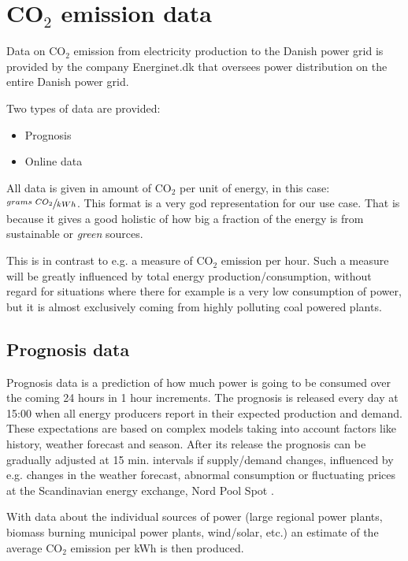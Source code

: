 \documentclass[Main]{subfiles}
\begin{document}
\section{CO$_2$ emission data} %
\label{sub:c02_emission_data}

	Data on CO$_2$ emission from electricity production to the Danish power grid is provided by the company Energinet.dk that oversees power distribution on the entire Danish power grid.

	Two types of data are provided:
	\begin{itemize}
		\item Prognosis \cite{EnerginetFTPPrognosis:Online}
		\item Online data \cite{EnerginetFTPOnline:Online}
	\end{itemize}

	All data is given in amount of CO$_2$ per unit of energy, in this case: 
	$\sfrac{grams\ CO_2}{kWh}$.
	This format is a very god representation for our use case.
	That is because it gives a good holistic of how big a fraction of the energy is from sustainable or \emph{green} sources.
	
	This is in contrast to e.g. a measure of CO$_2$ emission per hour.
	Such a measure will be greatly influenced by total energy production/consumption, without regard for situations where there for example is a very low consumption of power, but it is almost exclusively coming from highly polluting coal powered plants.

	\subsection{Prognosis data} %
	\label{sub:prognosis}
		Prognosis data is a prediction of how much power is going to be consumed over the coming 24 hours in 1 hour increments.
		The prognosis is released every day at 15:00 when all energy producers report in their expected production and demand.
		These expectations are based on complex models taking into account factors like history, weather forecast and season.
		After its release the prognosis can be gradually adjusted at 15 min. intervals if supply/demand changes, influenced by e.g. changes in the weather forecast, abnormal consumption or fluctuating prices at the Scandinavian energy exchange, Nord Pool Spot \cite{NordPool:Online}.

		With data about the individual sources of power (large regional power plants, biomass burning municipal power plants, wind/solar, etc.) an estimate of the average CO$_2$ emission per kWh is then produced.
\end{document}
